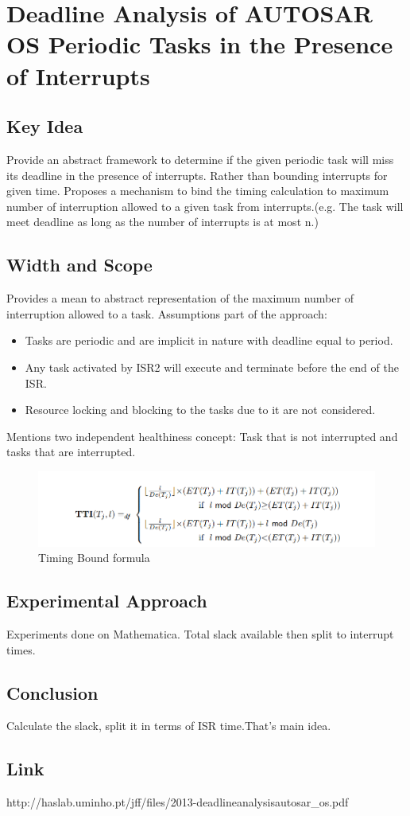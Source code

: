 \section{Deadline Analysis of AUTOSAR OS Periodic Tasks in the Presence of Interrupts}

\subsection*{Key Idea}
Provide an abstract framework to determine if the given periodic task will miss its deadline in the presence of interrupts.
Rather than bounding interrupts for given time. Proposes a mechanism to bind the timing calculation to maximum number of interruption allowed to a given task from interrupts.(e.g. The task will meet deadline as long as the number of interrupts is at most n.)
\subsection*{Width and Scope}
Provides a mean to abstract representation of the maximum number of interruption allowed to a task.
Assumptions part of the approach:
\begin{itemize}
	\setlength{\itemsep}{0pt}
	\setlength{\parskip}{0pt}
	\setlength{\parsep}{0pt} 
	\item Tasks are periodic and are implicit in nature with deadline equal to period.
	\item Any task activated by ISR2 will execute and terminate before the end of the ISR.
	\item Resource locking and blocking to the tasks due to it are not considered.
\end{itemize}
Mentions two independent healthiness concept: Task that is not interrupted and tasks that are interrupted.
\begin{figure}[H]
	\centering
	\includegraphics[width=400pt]{Pictures/Autosar_TTI_Bound}
	\caption{Timing Bound formula}\label{abs}
\end{figure}
\subsection*{Experimental Approach}
Experiments done on Mathematica. Total slack available then split to interrupt times.
\subsection*{Conclusion}
Calculate the slack, split it in terms of ISR time.That's main idea.
\subsection*{Link}
http://haslab.uminho.pt/jff/files/2013-deadlineanalysisautosar\_os.pdf